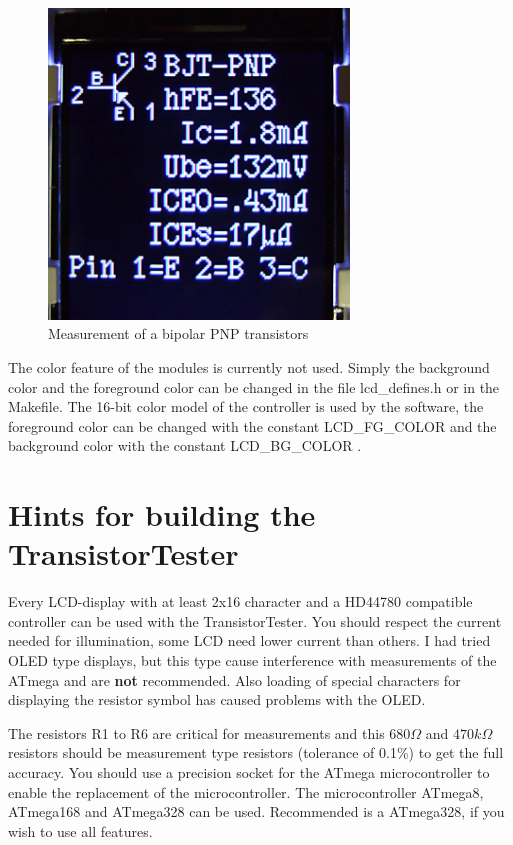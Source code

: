 \begin{figure}[H]
\centering
\includegraphics[width=8cm]{../PNG/Color_PNP_ILI9163.jpg}
\caption{Measurement of a bipolar PNP transistors}
\label{fig:Color_PNP}
\end{figure}

The color feature of the modules is currently not used.
Simply the background color and the foreground color can be changed in the file lcd\_defines.h or
in the Makefile.
The 16-bit color model of the controller is used by the software, the foreground color can be changed
with the constant LCD\_FG\_COLOR and the background color with the constant LCD\_BG\_COLOR .


\section{Hints for building the TransistorTester}
Every LCD-display with at least 2x16 character and a HD44780 compatible controller
can be used with the TransistorTester. You should respect the current needed for
illumination, some LCD need lower current than others.
I had tried OLED type displays, but this type cause interference with measurements
of the ATmega and are {\bf not} recommended. Also loading of special characters
for displaying the resistor symbol has caused problems with the OLED.

The resistors R1 to R6 are critical for measurements and this \(680\Omega\) and
\(470k\Omega\) resistors should be measurement type resistors (tolerance of 0.1\%) to
get the full accuracy.
You should use a precision socket for the ATmega microcontroller to enable
the replacement of the microcontroller.
The microcontroller ATmega8, ATmega168 and ATmega328 can be used.
Recommended is a ATmega328, if you wish to use all features.

